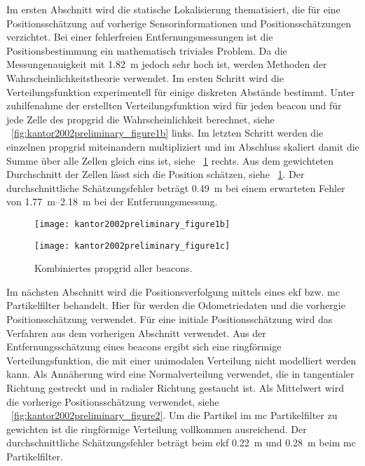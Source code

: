 Im ersten Abschnitt wird die statische Lokalisierung thematisiert, die für eine Positionsschätzung auf vorherige Sensorinformationen und Positionsschätzungen verzichtet. Bei einer fehlerfreien Entfernungsmessungen ist die Positionsbestimmung ein mathematisch triviales Problem. Da die Messungenauigkeit mit \SI{1.82}{\metre} jedoch sehr hoch ist, werden Methoden der Wahrscheinlichkeitstheorie verwendet. Im ersten Schritt wird die Verteilungsfunktion experimentell für einige diskreten Abstände bestimmt. Unter zuhilfenahme der erstellten Verteilungsfunktion wird für jeden \Gls{beacon} und für jede Zelle des \Gls{propgrid} die Wahrscheinlichkeit berechnet, siehe \figurename~\ref{fig:kantor2002preliminary_figure1b} links. Im letzten Schritt werden die einzelnen \Gls{propgrid} miteinandern multipliziert und im Abschluss skaliert damit die Summe über alle Zellen gleich eins ist, siehe \figurename~\ref{fig:kantor2002preliminary_figure1c} rechts. Aus dem gewichteten Durchschnitt der Zellen lässt sich die Position schätzen, siehe \figurename~\ref{fig:kantor2002preliminary_figure1c}. Der durchschnittliche Schätzungsfehler beträgt \SI{0.49}{\metre} bei einem erwarteten Fehler von \SIrange{1,77}{2,18}{\metre} bei der Entfernungsmessung.

\begin{figure}[htbp]
  \begin{minipage}[t]{0.45\linewidth}
    \centering
    \texttt{[image: kantor2002preliminary\_figure1b]}
    \caption{Links: \Gls{propgrid} pro \Gls{beacon}. Rechts: Kombination zweier \Glspl{propgrid}.}
    \label{fig:kantor2002preliminary_figure1b}
  \end{minipage}
  \hfill
  \begin{minipage}[t]{0.45\linewidth}
    \centering
    \texttt{[image: kantor2002preliminary\_figure1c]}
    \caption{Kombiniertes \Gls{propgrid} aller \Glspl{beacon}.}
    \label{fig:kantor2002preliminary_figure1c}
  \end{minipage}
\end{figure}

Im nächsten Abschnitt wird die Positionsverfolgung mittels eines \Gls{ekf} bzw. \Gls{mc} Partikelfilter behandelt. Hier für werden die Odometriedaten und die vorhergie Positionsschätzung verwendet. Für eine initiale Positionsschätzung wird das Verfahren aus dem vorherigen Abschnitt verwendet. Aus der Entfernungsschätzung eines \Glspl{beacon} ergibt sich eine ringförmige Verteilungsfunktion, die mit einer unimodalen Verteilung nicht modelliert werden kann. Als Annäherung wird eine Normalverteilung verwendet, die in tangentialer Richtung gestreckt und in radialer Richtung gestaucht ist. Als Mittelwert wird die vorherige Positionsschätzung verwendet, siehe \figurename~\ref{fig:kantor2002preliminary_figure2}. Um die Partikel im \Gls{mc} Partikelfilter zu gewichten ist die ringförmige Verteilung vollkommen ausreichend. Der durchschnittliche Schätzungsfehler beträgt beim \Gls{ekf} \SI{0.22}{\metre} und \SI{0.28}{\metre} beim \Gls{mc} Partikelfilter.

